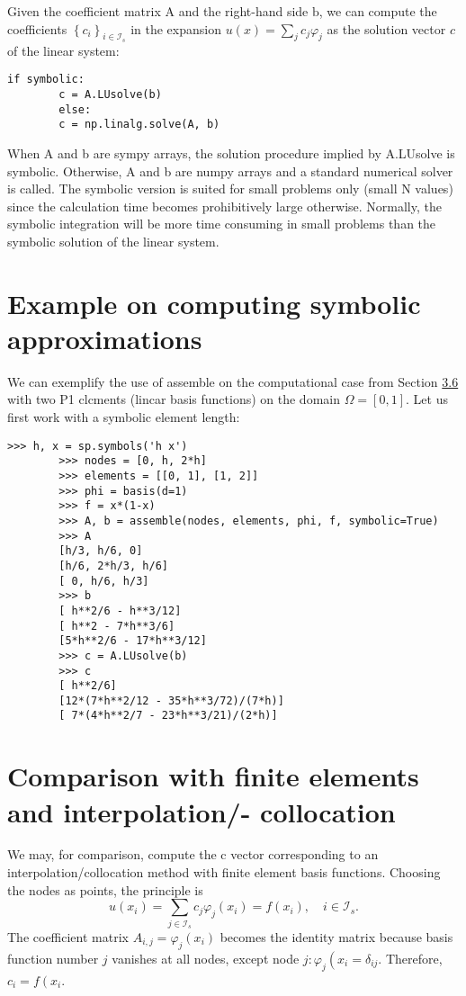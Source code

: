 \documentclass[../main.tex]{subfiles}
\begin{document}
	Given the coefficient matrix $\mathrm{A}$ and the right-hand side $\mathrm{b}$, we can compute the coefficients $\left\{c_{i}\right\}_{i \in \mathcal{I}_{s}}$ in the expansion $u(x)=\sum_{j} c_{j} \varphi_{j}$ as the solution vector $c$ of the linear system:
	\begin{lstlisting}[numbers=none]
		if symbolic:
		c = A.LUsolve(b)
		else:
		c = np.linalg.solve(A, b)
	\end{lstlisting}
	When A and b are sympy arrays, the solution procedure implied by A.LUsolve is
	symbolic. Otherwise, A and b are numpy arrays and a standard numerical solver
	is called. The symbolic version is suited for small problems only (small N values)
	since the calculation time becomes prohibitively large otherwise. Normally, the
	symbolic integration will be more time consuming in small problems than the
	symbolic solution of the linear system.
	\section[Example on computing symbolic approximations]{Example on computing symbolic approximations}
	\label{sec:sec_4_3}
	We can exemplify the use of assemble on the computational case from Section \hyperref[sec:sec_3_6]{3.6} with two P1 clcments (lincar basis functions) on the domain $\Omega=[0,1]$. Let us first work with a symbolic element length:
	\begin{lstlisting}[numbers=none]
		>>> h, x = sp.symbols('h x')
		>>> nodes = [0, h, 2*h]
		>>> elements = [[0, 1], [1, 2]]
		>>> phi = basis(d=1)
		>>> f = x*(1-x)
		>>> A, b = assemble(nodes, elements, phi, f, symbolic=True)
		>>> A
		[h/3, h/6, 0]
		[h/6, 2*h/3, h/6]
		[ 0, h/6, h/3]
		>>> b
		[ h**2/6 - h**3/12]
		[ h**2 - 7*h**3/6]
		[5*h**2/6 - 17*h**3/12]
		>>> c = A.LUsolve(b)
		>>> c
		[ h**2/6]
		[12*(7*h**2/12 - 35*h**3/72)/(7*h)]
		[ 7*(4*h**2/7 - 23*h**3/21)/(2*h)]	
	\end{lstlisting}
	\section[Comparison with finite elements and interpolation/- collocation]{Comparison with finite elements and interpolation/- collocation}
	\label{sec:sec_4_4}
	We may, for comparison, compute the c vector corresponding to an interpolation/collocation method with finite element basis functions. Choosing the nodes as points, the principle is
	$$
	u\left(x_{i}\right)=\sum_{j \in \mathcal{I}_{s}} c_{j} \varphi_{j}\left(x_{i}\right)=f\left(x_{i}\right), \quad i \in \mathcal{I}_{s}.
	$$
	The coefficient matrix $A_{i, j}=\varphi_{j}\left(x_{i}\right)$ becomes the identity matrix because basis function number $j$ vanishes at all nodes, except node $j: \varphi_{j}\left(x_{i}=\delta_{i j}\right.$. Therefore, $c_{i}=f\left(x_{i}\right.$.
	
\end{document}
